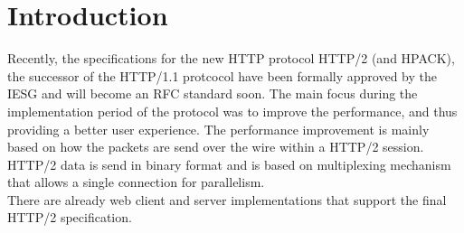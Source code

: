 \section{Introduction}
\label{chap:intro}
Recently, the specifications for the new HTTP protocol HTTP/2 (and HPACK), the successor of the HTTP/1.1 protcocol have been formally approved by the IESG and will become an RFC standard soon. The main focus during the implementation period of the protocol was to improve the performance, and thus providing a better user experience. The performance improvement is mainly based on how the packets are send over the wire within a HTTP/2 session. HTTP/2 data is send in binary format and is based on multiplexing mechanism that allows a single connection for parallelism.  \\
There are already web client and server implementations that support the final HTTP/2 specification.